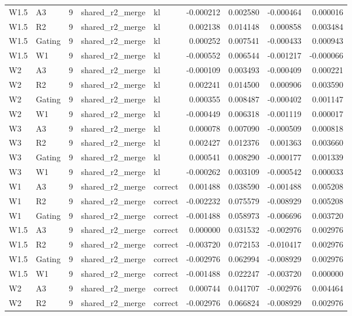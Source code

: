 \begin{tabular}{llrllrrrr}
W1.5 & A3 & 9 & shared_r2_merge & kl & -0.000212 & 0.002580 & -0.000464 & 0.000016 \\
W1.5 & R2 & 9 & shared_r2_merge & kl & 0.002138 & 0.014148 & 0.000858 & 0.003484 \\
W1.5 & Gating & 9 & shared_r2_merge & kl & 0.000252 & 0.007541 & -0.000433 & 0.000943 \\
W1.5 & W1 & 9 & shared_r2_merge & kl & -0.000552 & 0.006544 & -0.001217 & -0.000066 \\
W2 & A3 & 9 & shared_r2_merge & kl & -0.000109 & 0.003493 & -0.000409 & 0.000221 \\
W2 & R2 & 9 & shared_r2_merge & kl & 0.002241 & 0.014500 & 0.000906 & 0.003590 \\
W2 & Gating & 9 & shared_r2_merge & kl & 0.000355 & 0.008487 & -0.000402 & 0.001147 \\
W2 & W1 & 9 & shared_r2_merge & kl & -0.000449 & 0.006318 & -0.001119 & 0.000017 \\
W3 & A3 & 9 & shared_r2_merge & kl & 0.000078 & 0.007090 & -0.000509 & 0.000818 \\
W3 & R2 & 9 & shared_r2_merge & kl & 0.002427 & 0.012376 & 0.001363 & 0.003660 \\
W3 & Gating & 9 & shared_r2_merge & kl & 0.000541 & 0.008290 & -0.000177 & 0.001339 \\
W3 & W1 & 9 & shared_r2_merge & kl & -0.000262 & 0.003109 & -0.000542 & 0.000033 \\
W1 & A3 & 9 & shared_r2_merge & correct & 0.001488 & 0.038590 & -0.001488 & 0.005208 \\
W1 & R2 & 9 & shared_r2_merge & correct & -0.002232 & 0.075579 & -0.008929 & 0.005208 \\
W1 & Gating & 9 & shared_r2_merge & correct & -0.001488 & 0.058973 & -0.006696 & 0.003720 \\
W1.5 & A3 & 9 & shared_r2_merge & correct & 0.000000 & 0.031532 & -0.002976 & 0.002976 \\
W1.5 & R2 & 9 & shared_r2_merge & correct & -0.003720 & 0.072153 & -0.010417 & 0.002976 \\
W1.5 & Gating & 9 & shared_r2_merge & correct & -0.002976 & 0.062994 & -0.008929 & 0.002976 \\
W1.5 & W1 & 9 & shared_r2_merge & correct & -0.001488 & 0.022247 & -0.003720 & 0.000000 \\
W2 & A3 & 9 & shared_r2_merge & correct & 0.000744 & 0.041707 & -0.002976 & 0.004464 \\
W2 & R2 & 9 & shared_r2_merge & correct & -0.002976 & 0.066824 & -0.008929 & 0.002976 \\

\end{tabular}
